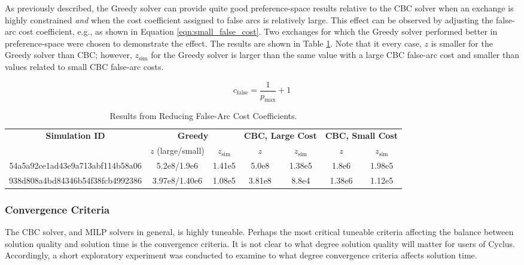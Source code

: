 As previously described, the Greedy solver can provide quite good
preference-space results relative to the CBC solver when an exchange is highly
constrained \textit{and} when the cost coefficient assigned to false arcs is
relatively large. This effect can be observed by adjusting the false-arc cost
coefficient, e.g., as shown in Equation \ref{eqn:small_false_cost}. Two
exchanges for which the Greedy solver performed better in preference-space were
chosen to demonstrate the effect. The results are shown in Table
\ref{tbl:false_arcs}. Note that it every case, $z$ is smaller for the Greedy
solver than CBC; however, $z_\text{sim}$ for the Greedy solver is larger than
the same value with a large CBC false-arc cost and smaller than values related
to small CBC false-arc costs.

\begin{equation}\label{eqn:small_false_cost}
c_\text{false} = \frac{1}{p_\text{max}} + 1
\end{equation}

\begin{table}[h!]
\centering
\caption{Results from Reducing False-Arc Cost Coefficients.}
\label{tbl:false_arcs}
\begin{tabular}{|c|c|c|c|c|c|c|}
\hline
\multirow{2}{*}{\textbf{Simulation ID}} 
& \multicolumn{2}{c|}{\textbf{Greedy}} 
& \multicolumn{2}{c|}{\textbf{CBC, Large Cost}} 
& \multicolumn{2}{c|}{\textbf{CBC, Small Cost}} \\ \cline{2-7} 
& $z$ (large/small)        & $z_{\text{sim}}$        
& $z$             & $z_{\text{sim}}$            
& $z$             & $z_{\text{sim}}$            \\ \hline
54a5a92ce1ad43e9a713abf114b58a06
& 5.2e8/1.9e6 & 1.41e5
& 5.0e8 & 1.38e5
& 1.8e6 & 1.98e5 \\ \hline
938d808a4bd84346b54f38fcb4992386
& 3.97e8/1.40e6 & 1.08e5
& 3.81e8 & 8.8e4
& 1.38e6 & 1.12e5 \\ \hline
\end{tabular}
\end{table}

\subsubsection{Convergence Criteria}

The CBC solver, and MILP solvers in general, is highly tuneable. Perhaps the
most critical tuneable criteria affecting the balance between solution quality
and solution time is the convergence criteria. It is not clear to what degree
solution quality will matter for users of Cyclus. Accordingly, a short
exploratory experiment was conducted to examine to what degree convergence
criteria affects solution time.


